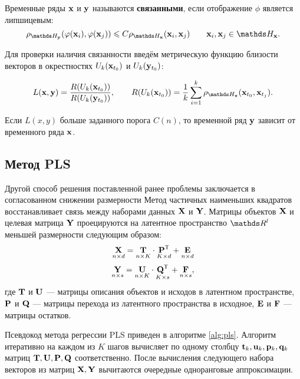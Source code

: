 \documentclass[a4paper, 12pt]{article}
\begin{document}
\begin{definition}
	Временные ряды $\mathbf{x}$ и $\mathbf{y}$ называются \textbf{связанными}, если отображение $\phi$ является липшицевым:
	$$ \rho_{\dH_{\by}}(\phi(\bx_i), \phi(\bx_j)) \leq C \rho_{\dH_{\bx}}(\bx_i, \bx_j) \qquad \bx_i, \bx_j \in \dH_{\bx}. $$
\end{definition}

Для проверки наличия связанности введём метрическую функцию близости векторов в окрестностях $U_k(\mathbf{x}_{t_0})$ и $U_k(\mathbf{y}_{t_0})$:

\begin{equation}
	L(\bx, \by) = \dfrac{R(U_k(\bx_{t_0}))}{R(U_k(\by_{t_0}))}, \qquad R(U_k(\bx_{t_0})) = \dfrac{1}{k} \sum\limits_{i=1}^k \rho_{\dH_{\bx}}(\bx_{t_0}, \bx_{t_j}).
\end{equation}

Если $L(x, y)$ больше заданного порога $C(n)$, то временной ряд $\mathbf{y}$ зависит от временного ряда $\mathbf{x}$.


\subsection{Метод PLS}
Другой способ решения поставленной ранее проблемы заключается в согласованном снижении размерности
Метод частичных наименьших квадратов восстанавливает связь между наборами данных $\mathbf{X}$ и $\mathbf{Y}$. 
Матрицы объектов $\mathbf{X}$ и целевая матрица $\mathbf{Y}$ проецируются на латентное пространство $\dR^l$ меньшей размерности следующим образом:
$$ \underset{n \times d}{\mathbf{X}} = \underset{n \times K}{\mathbf{T}} \cdot \underset{K \times d}{\mathbf{P}^{\mathsf{T}}} + \underset{n \times d}{\mathbf{E}} $$
$$ \underset{n \times s}{\mathbf{Y}} = \underset{n \times K}{\mathbf{U}} \cdot \underset{K \times s}{\mathbf{Q}^{\mathsf{T}}} + \underset{n \times s}{\mathbf{F}}, $$
где $\mathbf{T}$ и $\mathbf{U}$ --- матрицы описания объектов и исходов в латентном пространстве, $\mathbf{P}$ и $\mathbf{Q}$ --- матрицы перехода из латентного пространства в исходное, $\mathbf{E}$ и $\mathbf{F}$ --- матрицы остатков.

Псевдокод метода регрессии PLS приведен в алгоритме \ref{alg:pls}. Алгоритм итеративно на каждом из $K$ шагов вычисляет по одному столбцу $\mathbf{t}_k, \mathbf{u}_k, \mathbf{p}_k, \mathbf{q}_k$ матриц $\mathbf{T}, \mathbf{U}, \mathbf{P}, \mathbf{Q}$ соответственно. После вычисления следующего набора векторов из матриц $\mathbf{X}, \mathbf{Y}$ вычитаются очередные одноранговые аппроксимации.
\end{document}

